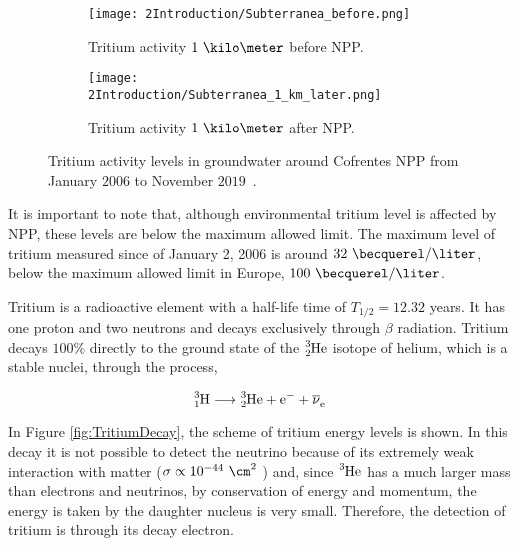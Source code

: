 \begin{figure}
\centering
    \begin{subfigure}[b]{0.7\textwidth}
    \centering
    \texttt{[image: 2Introduction/Subterranea\_before.png]}  
    \caption{Tritium activity $1~\kilo\meter$ before NPP.\label{subfig:TritiumLG1kB}}
    \end{subfigure}
    \hfill
    \begin{subfigure}[b]{0.7\textwidth}
    \centering
    \texttt{[image: 2Introduction/Subterranea\_1\_km\_later.png]}  
    \caption{Tritium activity $1~\kilo\meter$ after NPP.\label{subfig:TritiumLG1kA}}
    \end{subfigure}
 \caption{Tritium activity levels in groundwater around Cofrentes NPP from January $2006$ to November $2019$~\cite{REM}.}
 \label{fig:MeasurementsCofrentesGroundWater}
\end{figure}

It is important to note that, although environmental tritium level is affected by NPP, these levels are below the maximum allowed limit. The maximum level of tritium measured since of January 2, 2006 is around $32~\becquerel/\liter$, below the maximum allowed limit in Europe, $100~\becquerel/\liter$.

Tritium is a radioactive element with a half-life time of $T_{1/2}= 12.32$ years. It has one proton and two neutrons and decays exclusively through $\beta$ radiation. Tritium decays $100\%$ directly to the ground state of the $\ce{^{3}_{2}He}$ isotope of helium, which is a stable nuclei, through the process,

\begin{equation}
\ce{^{3}_{1}H} \longrightarrow \ce{^{3}_{2}He}  + \ce{e^-}  + \ce{\overline{\nu}_e}
\label{eq:TritiumDecay}
\end{equation}

In Figure \ref{fig:TritiumDecay}, the scheme of tritium energy levels is shown. In this decay it is not possible to detect the neutrino because of its extremely weak interaction with matter ($\sigma \propto 10^{-44} ~ \cm^2$ \cite{CrossSeccionNeutrino}) and, since $\ce{^{3}He}$ has a much larger mass than electrons and neutrinos, by conservation of energy and momentum, the energy is taken by the daughter nucleus is very small. Therefore, the detection of tritium is through its decay electron. 

